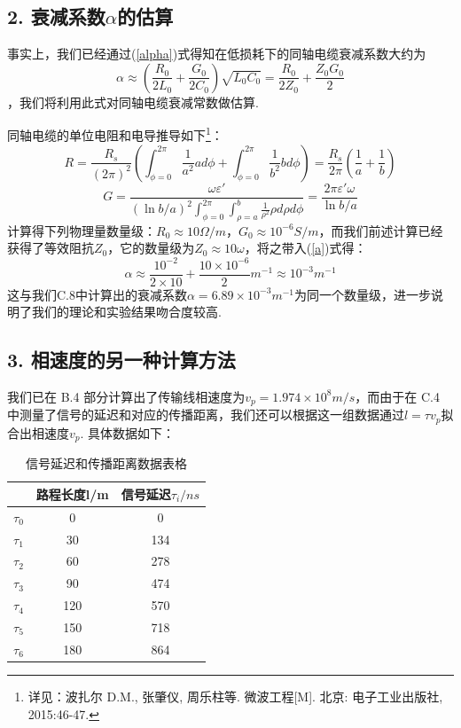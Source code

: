 \documentclass[UTF8]{ctexart}
\begin{document}
\subsection*{2. 衰减系数$\alpha$的估算}
事实上，我们已经通过(\ref{alpha})式得知在低损耗下的同轴电缆衰减系数大约为\begin{equation}\alpha\approx(\frac{R_0}{2L_0}+\frac{G_0}{2C_0})\sqrt{L_0C_0}=\frac{R_0}{2Z_0}+\frac{Z_0G_0}{2}\label{a}\end{equation}，我们将利用此式对同轴电缆衰减常数做估算.

同轴电缆的单位电阻和电导推导如下\footnote{详见：波扎尔 D.M., 张肇仪, 周乐柱等. 微波工程[M]. 北京: 电子工业出版社, 2015:46-47.}：
\begin{equation}
    R=\frac{R_s}{(2\pi)^2}(\int_{\phi=0}^{2\pi}\frac{1}{a^2}ad\phi+\int_{\phi=0}^{2\pi}\frac{1}{b^2}bd\phi)=\frac{R_s}{2\pi}(\frac{1}{a}+\frac{1}{b})
\end{equation}
\begin{equation}
    G=\frac{\omega \varepsilon'}{(\ln b/a)^2\int^{2\pi}_{\phi=0}\int^{b}_{\rho =a}\frac{1}{\rho^2}\rho d\rho d\phi}=\frac{2\pi \varepsilon'\omega}{\ln b/a}
\end{equation}
计算得下列物理量数量级：$R_0\approx 10\Omega/m$，$G_0\approx 10^{-6}S/m$，而我们前述计算已经获得了等效阻抗$Z_0$，它的数量级为$Z_0\approx 10\omega$，将之带入(\ref{a})式得：
\[\alpha \approx \frac{10^{-2}}{2\times 10}+\frac{10\times 10^{-6}}{2}m^{-1}\approx 10^{-3}m^{-1}\]
这与我们C.8中计算出的衰减系数$\alpha=6.89\times 10^{-3}m^{-1}$为同一个数量级，进一步说明了我们的理论和实验结果吻合度较高.


\subsection*{3. 相速度的另一种计算方法}
我们已在 B.4 部分计算出了传输线相速度为$v_p=1.974\times 10^8m/s$，而由于在 C.4 中测量了信号的延迟和对应的传播距离，我们还可以根据这一组数据通过$l=\tau v_{p}$拟合出相速度$v_p$. 具体数据如下：
\begin{table}[H]
    \centering
\begin{tabular}{|c|c|c|}
        \hline
        &路程长度l/m&信号延迟$\tau_i/ns$\\
        \hline
        $\tau_0$&0&0\\
        \hline
        $\tau_1$&30&134\\ 
        \hline
        $\tau_2$&60&278\\ 
        \hline
        $\tau_3$&90&474\\ 
        \hline
        $\tau_4$&120&570\\ 
        \hline
        $\tau_5$&150&718\\ 
        \hline
        $\tau_6$&180&864\\ 
        \hline
    \end{tabular} 
    \caption{信号延迟和传播距离数据表格} 
\end{table} 
\end{document}
